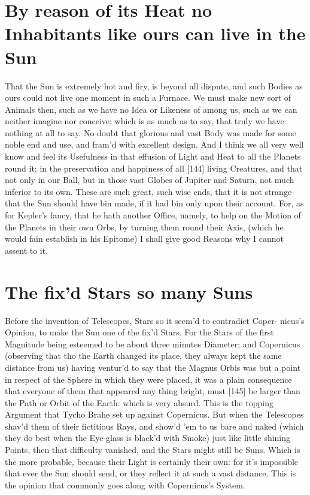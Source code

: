 \documentclass[letterpaper]{book}
\begin{document}
\section{By reason of its Heat no Inhabitants like ours can live in the Sun}

That the Sun is extremely hot and firy, is beyond all dispute, and such
Bodies as ours could not live one moment in such a Furnace. We must make new
sort of Animals then, such as we have no Idea or Likeness of among us, such
as we can neither imagine nor conceive: which is as much as to say, that
truly we have nothing at all to say. No doubt that glorious and vast Body
was made for some noble end and use, and fram'd with excellent design.  And I
think we all very well know and feel its Usefulness in that effusion of
Light and Heat to all the Planets round it; in the preservation and
happiness of all [144] living Creatures, and that not only in our Ball, but
in those vast Globes of Jupiter and Saturn, not much inferior to its own.
These are such great, such wise ends, that it is not strange that the Sun
should have bin made, if it had bin only upon their account. For, as for
Kepler's fancy, that he hath another Office, namely, to help on the Motion
of the Planets in their own Orbs, by turning them round their Axis, (which
he would fain establish in his Epitome) I shall give good Reasons why I
cannot assent to it.


\section{The fix'd Stars so many Suns}

Before the invention of Telescopes, Stars so it seem'd to contradict Coper-
nicus's Opinion, to make the Sun one of the fix'd Stars. For the Stars of
the first Magnitude being esteemed to be about three minutes Diameter; and
Copernicus (observing that tho the Earth changed its place, they always kept
the same distance from us) having ventur'd to say that the Magnus Orbis was
but a point in respect of the Sphere in which they were placed, it was a
plain consequence that everyone of them that appeared any thing bright, must
[145] be larger than the Path or Orbit of the Earth: which is very absurd.
This is the topping Argument that Tycho Brahe set up against Copernicus. But
when the Telescopes shav'd them of their fictitious Rays, and show'd 'em to
us bare and naked (which they do best when the Eye-glass is black'd with
Smoke) just like little shining Points, then that difficulty vanished, and
the Stars might still be Suns. Which is the more probable, because their
Light is certainly their own: for it's impossible that ever the Sun should
send, or they reflect it at such a vast distance. This is the opinion that
commonly goes along with Copernicus's System.
\end{document}
